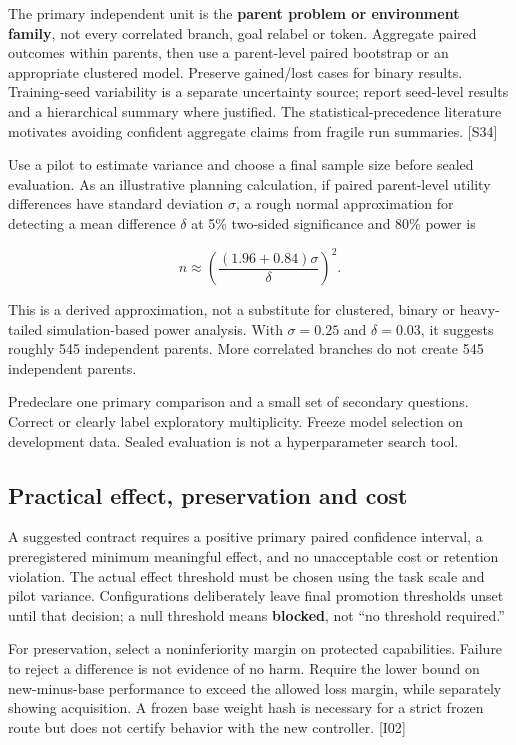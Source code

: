 \documentclass[
  11pt,
  a4paper,
]{article}
\begin{document}
The primary independent unit is the \textbf{parent problem or
environment family}, not every correlated branch, goal relabel or token.
Aggregate paired outcomes within parents, then use a parent-level paired
bootstrap or an appropriate clustered model. Preserve gained/lost cases
for binary results. Training-seed variability is a separate uncertainty
source; report seed-level results and a hierarchical summary where
justified. The statistical-precedence literature motivates avoiding
confident aggregate claims from fragile run summaries. {[}S34{]}

Use a pilot to estimate variance and choose a final sample size before
sealed evaluation. As an illustrative planning calculation, if paired
parent-level utility differences have standard deviation \(\sigma\), a
rough normal approximation for detecting a mean difference \(\delta\) at
5\% two-sided significance and 80\% power is

\[
n\approx\left(\frac{(1.96+0.84)\sigma}{\delta}\right)^2.
\]

This is a derived approximation, not a substitute for clustered, binary
or heavy-tailed simulation-based power analysis. With \(\sigma=0.25\)
and \(\delta=0.03\), it suggests roughly 545 independent parents. More
correlated branches do not create 545 independent parents.

Predeclare one primary comparison and a small set of secondary
questions. Correct or clearly label exploratory multiplicity. Freeze
model selection on development data. Sealed evaluation is not a
hyperparameter search tool.

\subsection{Practical effect, preservation and
cost}\label{practical-effect-preservation-and-cost}

A suggested contract requires a positive primary paired confidence
interval, a preregistered minimum meaningful effect, and no unacceptable
cost or retention violation. The actual effect threshold must be chosen
using the task scale and pilot variance. Configurations deliberately
leave final promotion thresholds unset until that decision; a null
threshold means \textbf{blocked}, not ``no threshold required.''

For preservation, select a noninferiority margin on protected
capabilities. Failure to reject a difference is not evidence of no harm.
Require the lower bound on new-minus-base performance to exceed the
allowed loss margin, while separately showing acquisition. A frozen base
weight hash is necessary for a strict frozen route but does not certify
behavior with the new controller. {[}I02{]}
\end{document}

